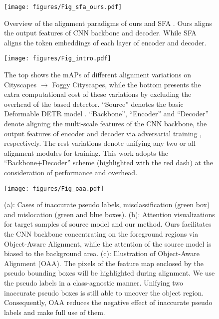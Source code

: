 \documentclass[sigconf]{acmart}
\begin{document}
\begin{figure}[t]
    \centerline{\texttt{[image: figures/Fig\_sfa\_ours.pdf]}}
    \caption{Overview of the alignment paradigms of ours and SFA \cite{wang2021exploring}. Ours aligns the output features of CNN backbone and decoder. While SFA aligns the token embeddings of each layer of encoder and decoder.}
    \label{fig:fig_oaa_sfa}
    \vspace{-6mm}
\end{figure}



\begin{figure*}[t]
    \centerline{\texttt{[image: figures/Fig\_intro.pdf]}} \vspace{-4mm}
    \caption{The top shows the mAPs of different alignment variations on Cityscapes $\rightarrow$ Foggy Cityscapes, while the bottom presents the extra computational cost of these variations by excluding the overhead of the based detector. ``Source'' denotes the basic Deformable DETR model \cite{zhu2020deformable}. ``Backbone'', ``Encoder'' and ``Decoder'' denote aligning the multi-scale features of the CNN backbone, the output features of encoder and decoder via adversarial training \cite{dann}, respectively. The rest variations denote unifying any two or all alignment modules for training. This work adopts the ``Backbone+Decoder'' scheme (highlighted with the red dash) at the consideration of performance and overhead.}
    \label{fig:fig_intro}
\end{figure*}

\begin{figure}[t]
    \centerline{\texttt{[image: figures/Fig\_oaa.pdf]}}
    \caption{(a): Cases of inaccurate pseudo labels, misclassification (green box) and mislocation (green and blue boxes). (b): Attention visualizations for target samples of source model and our method. Ours facilitates the CNN backbone concentrating on the foreground regions via Object-Aware Alignment, while the attention of the source model is biased to the background area. (c): Illustration of Object-Aware Alignment (OAA). The pixels of the feature map enclosed by the pseudo bounding boxes will be highlighted during alignment. We use the pseudo labels in a class-agnostic manner. Unifying two inaccurate pseudo boxes is still able to uncover the object region. Consequently, OAA reduces the negative effect of inaccurate pseudo labels and make full use of them.}
    \label{fig:fig_oaa}
    \vspace{-4mm}
\end{figure}
\end{document}
